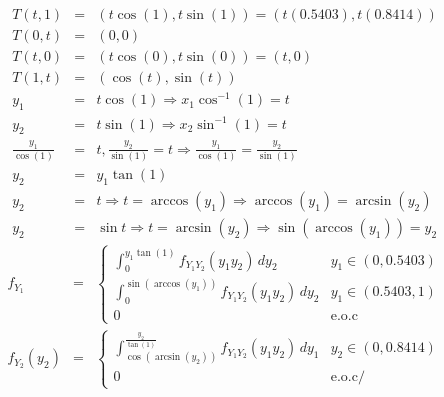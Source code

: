 \begin{Ejem}
\begin{eqnarray*}
T \left(t,1 \right) &=& \left( t \cos \left(1 \right), t \sin \left(1 \right) \right) = \left( t \left(0.5403 \right), t \left( 0.8414 \right) \right)\\
T \left(0,t \right) &=& \left(0,0 \right)\\
T \left(t,0 \right) &=& \left( t \cos \left(0 \right), t \sin \left(0 \right) \right)= \left( t,0 \right)\\
T \left(1,t \right) &=& \left( \cos \left(t \right), \sin \left(t \right) \right)\\
y_{1} &=& t \cos \left(1 \right) \Rightarrow x_{1} \cos^{-1} \left(1 \right)= t\\
y_{2} &=& t \sin \left(1 \right) \Rightarrow x_{2} \sin^{-1} \left(1 \right)= t\\
\frac{y_{1}}{\cos \left(1 \right) } &=& t, \frac{y_{2}}{\sin \left(1 \right) }= t \Rightarrow
\frac{y_{1}}{\cos \left(1 \right) } =  \frac{y_{2}}{\sin \left(1 \right) } \\
y_{2}&=& y_{1} \tan \left(1 \right)\\
y_{2}&=&t \Rightarrow
t= \arccos \left(y_{1} \right) \Rightarrow \arccos \left(y_{1} \right) = \arcsin \left(y_{2} \right)\\
y_{2} &=& \sin t \Rightarrow t= \arcsin \left( y_{2} \right) \Rightarrow \sin \left( \arccos \left(y_{1} \right) \right) = y_{2}
\end{eqnarray*}
\begin{eqnarray*}
f_{Y_{1}} &=& \begin{cases}
\int_{0} ^{y_{1} \tan \left(1 \right) } f_{Y_{1}Y_{2}} \left( y_{1}y_{2} \right) \, dy_{2} & y_{1} \in \left(0,0.5403 \right)\\
\int_{0}^{\sin \left(\arccos \left(y_{1} \right) \right) }  f_{Y_{1}Y_{2}} \left( y_{1}y_{2} \right) \, dy_{2} & y_{1} \in \left(0.5403, 1 \right)\\
0 & \textrm{e.o.c}
\end{cases}\\ 
f_{Y_{2}} \left(y_{2} \right) &=&
\begin{cases}
\int_{\cos \left( \arcsin \left( y_{2} \right) \right) } ^{\frac{y_{2}}{\tan \left( 1\right) } }  f_{Y_{1}Y_{2}} \left( y_{1}y_{2} \right) \, dy_{1} & y_{2} \in \left( 0 , 0.8414 \right)\\
0 & \textrm{e.o.c/}
\end{cases}
\end{eqnarray*}
\end{Ejem}
